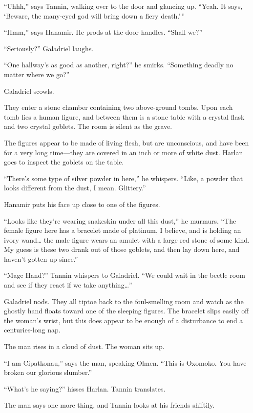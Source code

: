 \documentclass[smalldemyvopaper,11pt,twoside,onecolumn,openright,extrafontsizes]{memoir}
\begin{document}
``Uhhh,'' says Tannin, walking over to the door and glancing up. ``Yeah.
It says, `Beware, the many-eyed god will bring down a fiery death.'\,''

``Hmm,'' says Hanamir. He prods at the door handles. ``Shall we?''

``Seriously?'' Galadriel laughs.

``One hallway's as good as another, right?'' he smirks. ``Something
deadly no matter where we go?''

Galadriel scowls.

They enter a stone chamber containing two above-ground tombs. Upon each
tomb lies a human figure, and between them is a stone table with a
crystal flask and two crystal goblets. The room is silent as the grave.

The figures appear to be made of living flesh, but are unconscious, and
have been for a very long time---they are covered in an inch or more of
white dust. Harlan goes to inspect the goblets on the table.

``There's some type of silver powder in here,'' he whispers. ``Like, a
powder that looks different from the dust, I mean. Glittery.''

Hanamir puts his face up close to one of the figures.

``Looks like they're wearing snakeskin under all this dust,'' he
murmurs. ``The female figure here has a bracelet made of platinum, I
believe, and is holding an ivory wand\ldots{} the male figure wears an
amulet with a large red stone of some kind. My guess is these two drank
out of those goblets, and then lay down here, and haven't gotten up
since.''

``Mage Hand?'' Tannin whispers to Galadriel. ``We could wait in the
beetle room and see if they react if we take anything\ldots{}''

Galadriel nods. They all tiptoe back to the foul-smelling room and watch
as the ghostly hand floats toward one of the sleeping figures. The
bracelet slips easily off the woman's wrist, but this does appear to be
enough of a disturbance to end a centuries-long nap.

The man rises in a cloud of dust. The woman sits up.

``I am Cipatkonau,'' says the man, speaking Olmen. ``This is Oxomoko.
You have broken our glorious slumber.''

``What's he saying?'' hisses Harlan. Tannin translates.

The man says one more thing, and Tannin looks at his friends shiftily.
\end{document}
